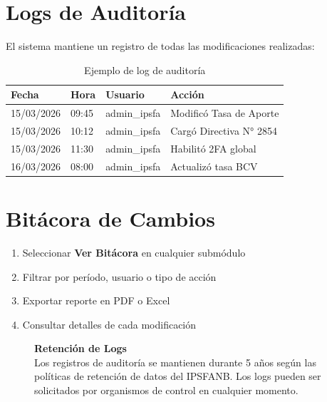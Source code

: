 \section{Logs de Auditoría}

El sistema mantiene un registro de todas las modificaciones realizadas:

\begin{longtable}{p{3cm}p{3cm}p{3cm}p{4cm}}
\toprule
\textbf{Fecha} & \textbf{Hora} & \textbf{Usuario} & \textbf{Acción} \\
\midrule
\endhead
\bottomrule
\caption{Ejemplo de log de auditoría}
\label{tab:log-auditoria}
\endlastfoot

15/03/2026 & 09:45 & admin\_ipsfa & Modificó Tasa de Aporte \\
15/03/2026 & 10:12 & admin\_ipsfa & Cargó Directiva N° 2854 \\
15/03/2026 & 11:30 & admin\_ipsfa & Habilitó 2FA global \\
16/03/2026 & 08:00 & admin\_ipsfa & Actualizó tasa BCV \\
\end{longtable}

\section{Bitácora de Cambios}

\begin{enumerate}[leftmargin=*]
    \item Seleccionar \textbf{Ver Bitácora} en cualquier submódulo
    \item Filtrar por período, usuario o tipo de acción
    \item Exportar reporte en PDF o Excel
    \item Consultar detalles de cada modificación
\end{enumerate}

\begin{figure}[H]
\begin{tcolorbox}[
    enhanced,
    colback=sandraSoft,
    colframe=sandraDark,
    width=0.9\textwidth,
    halign=center
]
\small
\textbf{Retención de Logs}\\
\smallskip
Los registros de auditoría se mantienen durante 5 años según las políticas de retención de datos del IPSFANB. Los logs pueden ser solicitados por organismos de control en cualquier momento.
\end{tcolorbox}
\end{figure}

